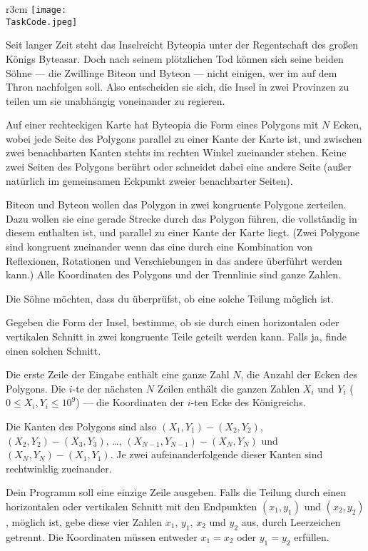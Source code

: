 \documentclass{boi2014-de}
\renewcommand{\TaskCode}{demarcation}
\begin{document}
    \begin{wrapfigure}{r}{3cm}
        \vspace{-24pt}
		\texttt{[image: \\TaskCode.jpeg]}
	\end{wrapfigure}
    
    Seit langer Zeit steht das Inselreicht Byteopia unter der Regentschaft des großen Königs Byteasar.
    Doch nach seinem plötzlichen Tod können sich seine beiden Söhne --- die Zwillinge Biteon und Byteon --- nicht einigen, wer im auf dem Thron nachfolgen soll.
    Also entscheiden sie sich, die Insel in zwei Provinzen zu teilen um sie unabhängig voneinander zu regieren.
 
    Auf einer rechteckigen Karte hat Byteopia die Form eines Polygons mit $N$ Ecken, wobei jede Seite des Polygons parallel zu einer Kante der Karte ist, und zwischen zwei benachbarten Kanten stehts im rechten Winkel zueinander stehen. Keine zwei Seiten des Polygons berührt oder schneidet dabei eine andere Seite (außer natürlich im gemeinsamen Eckpunkt zweier benachbarter Seiten).
    
    Biteon und Byteon wollen das Polygon in zwei kongruente Polygone zerteilen. Dazu wollen sie eine gerade Strecke durch das Polygon führen, die vollständig in diesem enthalten ist, und parallel zu einer Kante der Karte liegt. (Zwei Polygone sind kongruent zueinander wenn das eine durch eine Kombination von Reflexionen, Rotationen und Verschiebungen in das andere überführt werden kann.)
    Alle Koordinaten des Polygons und der Trennlinie sind ganze Zahlen.
 
    Die Söhne möchten, dass du überprüfst, ob eine solche Teilung möglich ist.

    \Task
    Gegeben die Form der Insel, bestimme, ob sie durch einen horizontalen oder vertikalen Schnitt in zwei kongruente Teile geteilt werden kann.
    Falls ja, finde einen solchen Schnitt.
    
    \Input
    Die erste Zeile der Eingabe enthält eine ganze Zahl $N$, die Anzahl der Ecken des Polygons.
    Die $i$-te der nächsten $N$ Zeilen enthält die ganzen Zahlen $X_i$ und $Y_i$ ($0 \le X_i, Y_i \le 10^9$) --- die Koordinaten der $i$-ten Ecke des Königreichs.
    
    Die Kanten des Polygons sind also $(X_1,Y_1) - (X_2,Y_2)$, $(X_2,Y_2) - (X_3,Y_3)$, \ldots, $(X_{N-1},Y_{N-1}) - (X_N,Y_N)$ und $(X_N,Y_N) - (X_1,Y_1)$.
    Je zwei aufeinanderfolgende dieser Kanten sind rechtwinklig zueinander.

    \Output
    Dein Programm soll eine einzige Zeile ausgeben.
    Falls die Teilung durch einen horizontalen oder vertikalen Schnitt mit den Endpunkten $(x_1, y_1)$ und $(x_2, y_2)$, möglich ist, gebe diese vier Zahlen $x_1$, $y_1$, $x_2$ und $y_2$ aus, durch Leerzeichen getrennt. Die Koordinaten müssen entweder $x_1 = x_2$ oder $y_1 = y_2$ erfüllen.
    
\end{document}
